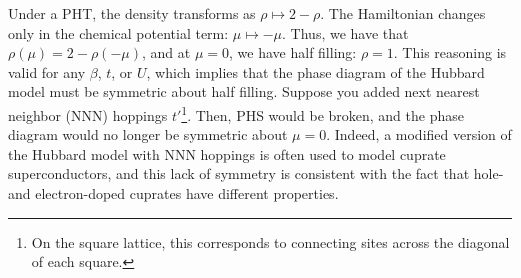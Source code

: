 Under a \ac{PHT}, the density transforms as $\rho \mapsto 2 - \rho$.
The Hamiltonian changes only in the chemical potential term: $\mu \mapsto -\mu$.
Thus, we have that $\rho (\mu) = 2 - \rho (-\mu)$, and at $\mu = 0$, we have half filling: $\rho = 1$.
This reasoning is valid for any $\beta$, $t$, or $U$, which implies that the phase diagram of the Hubbard model must be symmetric about half filling.
Suppose you added next nearest neighbor (NNN) hoppings $t'$\footnote{On the square lattice, this corresponds to connecting sites across the diagonal of each square.}.
Then, PHS would be broken, and the phase diagram would no longer be symmetric about $\mu = 0$.
Indeed, a modified version of the Hubbard model with NNN hoppings is often used to model cuprate superconductors, and this lack of symmetry is consistent with the fact that hole- and electron-doped cuprates have different properties. 